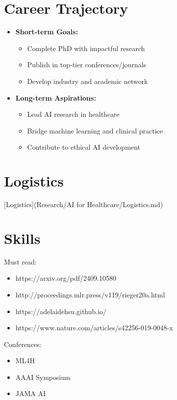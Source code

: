 \section{Career Trajectory}
\begin{itemize}
    \item \textbf{Short-term Goals:}
    \begin{itemize}
        \item Complete PhD with impactful research
        \item Publish in top-tier conferences/journals
        \item Develop industry and academic network
    \end{itemize}
    
    \item \textbf{Long-term Aspirations:}
    \begin{itemize}
        \item Lead AI research in healthcare
        \item Bridge machine learning and clinical practice
        \item Contribute to ethical AI development
    \end{itemize}
\end{itemize}


\section{Logistics}
[Logistics](Research/AI for Healthcare/Logistics.md)

\section{Skills}
Must read:
\begin{itemize}
    \item https://arxiv.org/pdf/2409.10580
    \item http://proceedings.mlr.press/v119/rieger20a.html
    \item https://adelaidehsu.github.io/
    \item https://www.nature.com/articles/s42256-019-0048-x
\end{itemize}

Conferences:
\begin{itemize}
    \item ML4H
    \item AAAI Symposium
    \item JAMA AI
\end{itemize}

